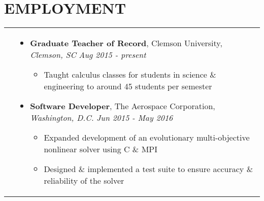 \documentclass[10pt]{article}
\begin{document}
\section{\textbf{EMPLOYMENT}}
\vspace*{-\baselineskip}
\hskip-1.7in
\begin{tabularx}{1.5\linewidth}{>{\raggedleft\scshape}p{3cm}X}

  &\begin{itemize}
    \setlength\itemsep{.005em}

               
                   \setlength\itemsep{.005em}
  \item \textbf{Graduate Teacher of Record}, 
  Clemson University,  \textit{Clemson, SC}  \hspace{22 mm}\textit{Aug 2015 - present}
    \vspace{-2mm}
       \begin{itemize}
           \setlength\itemsep{.005em}
   \item Taught calculus classes for students in science \& engineering to around 45 students per semester
   \end{itemize}  
 

  \item \textbf{Software Developer}, The Aerospace Corporation, \textit{Washington, D.C.}    \hspace{14 mm}\textit{Jun 2015 - May 2016}
                \vspace{-2mm}
             \begin{itemize}
             \setlength\itemsep{.005em}
   \item Expanded development of an evolutionary multi-objective nonlinear solver using C \& MPI
   
   \item Designed \& implemented a test suite to ensure accuracy \& reliability of the solver
   \end{itemize}  



  \end{itemize} 

\end{tabularx}
\end{document}
